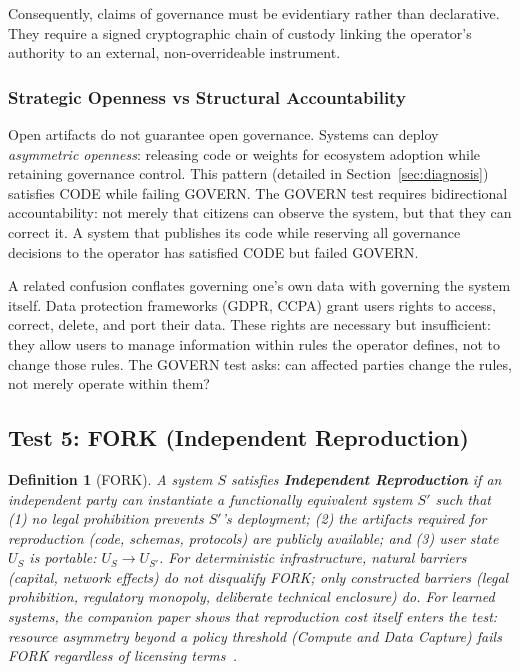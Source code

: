 \documentclass{article}
\newtheorem{definition}{Definition}[section]
\begin{document}
Consequently, claims of governance must be evidentiary rather than declarative. They require a signed cryptographic chain of custody linking the operator's authority to an external, non-overrideable instrument.

\subsubsection{Strategic Openness vs Structural Accountability}

Open artifacts do not guarantee open governance. Systems can deploy \textit{asymmetric openness}: releasing code or weights for ecosystem adoption while retaining governance control. This pattern (detailed in Section~\ref{sec:diagnosis}) satisfies CODE while failing GOVERN. The GOVERN test requires bidirectional accountability: not merely that citizens can observe the system, but that they can correct it. A system that publishes its code while reserving all governance decisions to the operator has satisfied CODE but failed GOVERN.

A related confusion conflates governing one's own data with governing the system itself. Data protection frameworks (GDPR, CCPA) grant users rights to access, correct, delete, and port their data. These rights are necessary but insufficient: they allow users to manage information within rules the operator defines, not to change those rules. The GOVERN test asks: can affected parties change the rules, not merely operate within them?

\subsection{Test 5: FORK (Independent Reproduction)}

\begin{definition}[FORK]
\label{def:fork}
A system $S$ satisfies \textbf{Independent Reproduction} if an independent party can instantiate a functionally equivalent system $S'$ such that (1) no legal prohibition prevents $S'$'s deployment; (2) the artifacts required for reproduction (code, schemas, protocols) are publicly available; and (3) user state $U_S$ is portable: $U_S \to U_{S'}$. For deterministic infrastructure, natural barriers (capital, network effects) do not disqualify FORK; only constructed barriers (legal prohibition, regulatory monopoly, deliberate technical enclosure) do. For learned systems, the companion paper shows that reproduction cost itself enters the test: resource asymmetry beyond a policy threshold (Compute and Data Capture) fails FORK regardless of licensing terms~\citep{aravind2026epi}.
\end{definition}
\end{document}
